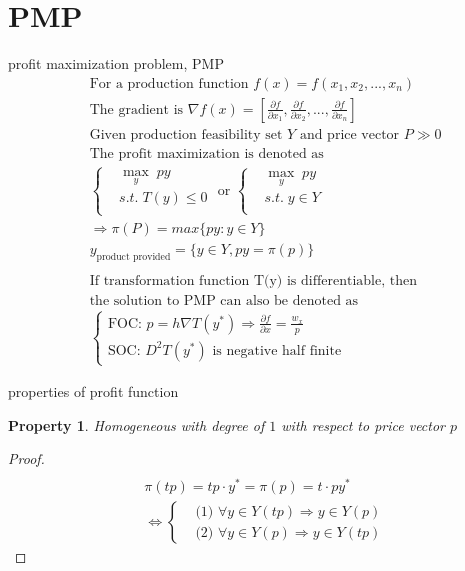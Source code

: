 \documentclass{article}
\newtheorem{property}{Property}
\begin{document}
\section{PMP}
profit maximization problem, PMP
\begin{align}
&\text{For a production function }f(x)=f(x_{1},x_{2},...,x_{n})
\\& \text{The gradient is }\nabla f(x)=[\frac{\partial f}{\partial x_{1}},\frac{\partial f}{\partial x_{2}},...,\frac{\partial f}{\partial x_{n}}]
\\&\text{Given production feasibility set } Y \text{ and price vector } P\gg 0
\\&\text{The profit maximization is denoted as}
\\&\begin{cases}
& \mathop{max}\limits_{y} \;py
\\& s.t. \; T(y) \leqslant 0  \\
\end{cases}
\text{ or } 
\begin{cases}
& \mathop{max}\limits_{y} \;py
\\&s.t. \;y\in Y  \\
\end{cases}
\\&\Rightarrow \pi(P)=max \{py:y\in Y\}
\\&y_{\text{product provided}}=\{y\in Y,py=\pi(p) \}
\\&
\\&\text{If transformation function T(y) is differentiable, then} 
\\&
\text{the solution to PMP can also be denoted as}
\\&
\begin{cases}\text{FOC: }p=h \nabla T(y^{*}) \Rightarrow \frac{\partial f}{\partial x}=\frac{w_{x}}{p}
\\\text{SOC: } D^{2}T(y^{*}) \text{ is negative half finite}
\end{cases}
\end{align}

properties of profit function
\begin{property}
Homogeneous with degree of $1$ with respect to price vector $p$
\end{property}

\begin{proof}
\begin{align}
\\& \pi(tp)=tp \cdot y^{*}= \pi(p)=t \cdot py^{*}
\\&\iff 
\begin{cases}
&\text{(1)  } \forall y \in Y(tp) \Rightarrow y \in Y(p)
\\&\text{(2) }\forall y \in Y(p) \Rightarrow y \in Y(tp)
\end{cases}
\end{align}
\end{proof}
\end{document}
